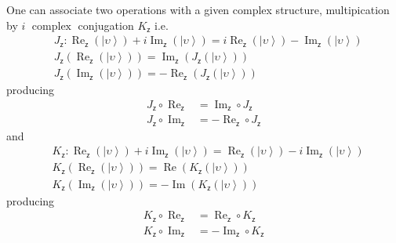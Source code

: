 \documentclass[aps,preprint]{revtex4}%
\begin{document}
One can associate two operations with a given complex structure, multipication
by $i$ $\operatorname{complex}$ conjugation $K_{\mathsf{z}}$ i.e.
\begin{align}
&  J_{\mathsf{z}}:\operatorname{Re}_{\mathsf{z}}\left(  \left\vert
\upsilon\right\rangle \right)  +i\operatorname{Im}_{\mathsf{z}}\left(
\left\vert \upsilon\right\rangle \right)  =i\operatorname{Re}_{\mathsf{z}%
}\left(  \left\vert \upsilon\right\rangle \right)  -\operatorname{Im}%
_{\mathsf{z}}\left(  \left\vert \upsilon\right\rangle \right)  \nonumber\\
&  J_{\mathsf{z}}\left(  \operatorname{Re}_{\mathsf{z}}\left(  \left\vert
\upsilon\right\rangle \right)  \right)  =\operatorname{Im}_{\mathsf{z}}\left(
J_{\mathsf{z}}\left(  \left\vert \upsilon\right\rangle \right)  \right)
\nonumber\\
&  J_{\mathsf{z}}\left(  \operatorname{Im}_{\mathsf{z}}\left(  \left\vert
\upsilon\right\rangle \right)  \right)  =-\operatorname{Re}_{\mathsf{z}%
}\left(  J_{\mathsf{z}}\left(  \left\vert \upsilon\right\rangle \right)
\right)
\end{align}
producing
\begin{align}
J_{\mathsf{z}}\circ\operatorname{Re}_{\mathsf{z}} &  =\operatorname{Im}%
_{\mathsf{z}}\circ J_{\mathsf{z}}\nonumber\\
J_{\mathsf{z}}\circ\operatorname{Im}_{\mathsf{z}} &  =-\operatorname{Re}%
_{\mathsf{z}}\circ J_{\mathsf{z}}%
\end{align}
and
\begin{align}
&  K_{\mathsf{z}}:\operatorname{Re}_{\mathsf{z}}\left(  \left\vert
\upsilon\right\rangle \right)  +i\operatorname{Im}_{\mathsf{z}}\left(
\left\vert \upsilon\right\rangle \right)  =\operatorname{Re}_{\mathsf{z}%
}\left(  \left\vert \upsilon\right\rangle \right)  -i\operatorname{Im}%
_{\mathsf{z}}\left(  \left\vert \upsilon\right\rangle \right)  \nonumber\\
&  K_{\mathsf{z}}\left(  \operatorname{Re}_{\mathsf{z}}\left(  \left\vert
\upsilon\right\rangle \right)  \right)  =\operatorname{Re}\left(
K_{\mathsf{z}}\left(  \left\vert \upsilon\right\rangle \right)  \right)
\nonumber\\
&  K_{\mathsf{z}}\left(  \operatorname{Im}_{\mathsf{z}}\left(  \left\vert
\upsilon\right\rangle \right)  \right)  =-\operatorname{Im}\left(
K_{\mathsf{z}}\left(  \left\vert \upsilon\right\rangle \right)  \right)
\end{align}
producing
\begin{align}
K_{\mathsf{z}}\circ\operatorname{Re}_{\mathsf{z}} &  =\operatorname{Re}%
_{\mathsf{z}}\circ K_{\mathsf{z}}\nonumber\\
K_{\mathsf{z}}\circ\operatorname{Im}_{\mathsf{z}} &  =-\operatorname{Im}%
_{\mathsf{z}}\circ K_{\mathsf{z}}%
\end{align}
\end{document}
